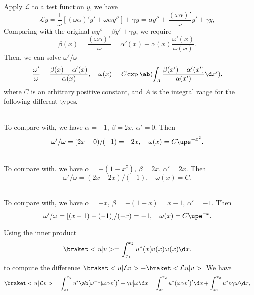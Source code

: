 \begin{solution}\leavevmode
  \begin{enumext}
    \item Apply $\mathcal L$ to a test function $y$, we have
    \[
      \mathcal Ly = \frac1\omega[(\omega\alpha)'y' + \omega\alpha y''] + \gamma y
    = \alpha y'' + \frac{(\omega\alpha)'}{\omega}y' + \gamma y,
    \]
    Comparing with the original $\alpha y'' + \beta y' + \gamma y$, we require
    \[
      \beta(x) = \frac{(\omega\alpha)'}{\omega} = \alpha'(x) + \alpha(x) \frac{\omega'(x)}{\omega(x)}.
    \]
    Then, we can solve $\omega'/\omega$
    \[
      \frac{\omega'}{\omega} = \frac{\beta(x) - \alpha'(x)}{\alpha(x)},
      \quad
      \omega(x) = C \exp\ab(\int_A \frac{\beta(x') - \alpha'(x')}{\alpha(x')} \d x'),
    \]
    where $C$ is an arbitrary positive constant,
    and $A$ is the integral range for the following different types.
    \begin{enumext}[wrap-label* = \underline{\emph{#1}}, list-indent = 0pt]
      \item [Hermite: $-y'' + 2xy' = \lambda y$]\leavevmode\\
      To compare with, we have $\alpha = -1$, $\beta = 2x$, $\alpha' = 0$. Then
      \[
        \omega'/\omega = (2x - 0)/(-1) = -2x, \quad
        \omega(x) = C \upe^{-x^2}.
      \]
      \item [Legendre: $-(1 - x^2)y'' + 2xy' = \lambda y$]\leavevmode\\
      To compare with, we have $\alpha = -(1 - x^2)$, $\beta = 2x$, $\alpha' = 2x$.
      Then
      \[
        \omega'/\omega = (2x - 2x)/(-1), \quad \omega(x) = C.
      \]
      \item [Laguerre: $-xy'' - (1 - x)y' = \lambda y$]\leavevmode\\
      To compare with, we have
      $\alpha = -x$, $\beta = -(1 - x) = x - 1$, $\alpha' = -1$. Then
      \[
        \omega'/\omega
      = [(x - 1) - (-1)]/(-x) = -1, \quad \omega(x) = C \upe^{-x}.
      \]
    \end{enumext}
    \item Using the inner product
    \[
      \braket<u|v> = \int_{x_1}^{x_2} u^*(x) v(x) \omega(x) \d x.
    \]
    to compute the difference $\braket<u|\mathcal Lv> - \braket<\mathcal Lu|v>$.
    We have
    \begin{align*}
      \braket<u|\mathcal Lv> & = \int_{x_1}^{x_2}
      u^* \ab[\omega^{-1} (\omega \alpha v')' + \gamma v] \omega \d x
    = \int_{x_1}^{x_2} u^* (\omega \alpha v')' \d x
    + \int_{x_1}^{x_2} u^* v \gamma \omega \d x,\\

\end{align*}
\end{enumext}
\end{solution}
